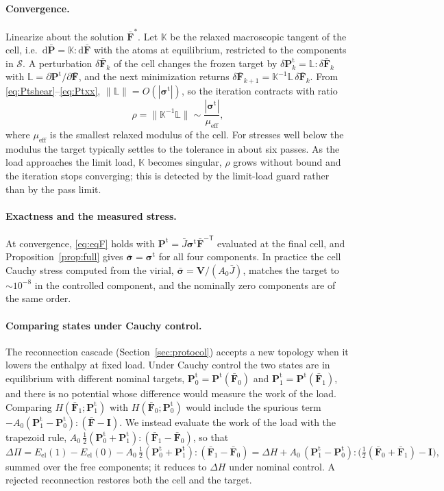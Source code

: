 \documentclass[11pt,a4paper]{article}
\newcommand{\Fb}{\bar{\mathbf F}}
\newcommand{\Pb}{\bar{\mathbf P}}
\newcommand{\sigb}{\bar{\bm\sigma}}
\newcommand{\Pt}{\mathbf P^{\mathrm t}}
\newcommand{\sigt}{\bm\sigma^{\mathrm t}}
\newcommand{\I}{\mathbf I}
\begin{document}
\paragraph{Convergence.}
Linearize about the solution \(\Fb^\ast\). Let \(\mathbb K\) be the relaxed macroscopic tangent of
the cell, i.e.\ \(\mathrm d\Pb=\mathbb K:\mathrm d\Fb\) with the atoms at equilibrium, restricted to
the components in \(\mathcal S\). A perturbation \(\delta\Fb_k\) of the cell changes the frozen target
by \(\delta\Pt_k=\mathbb L:\delta\Fb_k\) with \(\mathbb L=\partial\Pt/\partial\Fb\), and the next
minimization returns \(\delta\Fb_{k+1}=\mathbb K^{-1}\mathbb L\,\delta\Fb_k\). From
\eqref{eq:Ptshear}--\eqref{eq:Ptxx}, \(\|\mathbb L\|=O(|\sigt|)\), so the iteration contracts with
ratio
\begin{equation}
  \rho=\|\mathbb K^{-1}\mathbb L\|\sim\frac{|\sigt|}{\mu_{\mathrm{eff}}},
  \label{eq:rho}
\end{equation}
where \(\mu_{\mathrm{eff}}\) is the smallest relaxed modulus of the cell. For stresses well below
the modulus the target typically settles to the tolerance in about six passes. As the load
approaches the limit load, \(\mathbb K\) becomes singular, \(\rho\) grows without bound and the
iteration stops converging; this is detected by the limit-load guard rather than by the pass limit.

\paragraph{Exactness and the measured stress.}
At convergence, \eqref{eq:eqF} holds with \(\Pt=\bar J\sigt\Fb^{-\mathsf T}\) evaluated at the final
cell, and Proposition~\ref{prop:full} gives \(\sigb=\sigt\) for all four components. In practice
the cell Cauchy stress computed from the virial, \(\sigb=\mathbf V/(A_0\bar J)\), matches the target
to \(\sim10^{-8}\) in the controlled component, and the nominally zero components are of the same
order.

\paragraph{Comparing states under Cauchy control.}
The reconnection cascade (Section~\ref{sec:protocol}) accepts a new topology when it lowers the
enthalpy at fixed load. Under Cauchy control the two states are in equilibrium with different
nominal targets, \(\Pt_0=\Pt(\Fb_0)\) and \(\Pt_1=\Pt(\Fb_1)\), and there is no potential whose
difference would measure the work of the load. Comparing \(H(\Fb_1;\Pt_1)\) with \(H(\Fb_0;\Pt_0)\)
would include the spurious term \(-A_0(\Pt_1-\Pt_0):(\Fb-\I)\). We instead evaluate the work of the
load with the trapezoid rule, \(A_0\,\tfrac12(\Pt_0+\Pt_1):(\Fb_1-\Fb_0)\), so that
\begin{equation}
  \Delta\Pi=E_{\mathrm{el}}(1)-E_{\mathrm{el}}(0)-A_0\,\tfrac12(\Pt_0+\Pt_1):(\Fb_1-\Fb_0)
  =\Delta H+A_0\,(\Pt_1-\Pt_0):\big(\tfrac12(\Fb_0+\Fb_1)-\I\big),
  \label{eq:cauchyDPi}
\end{equation}
summed over the free components; it reduces to \(\Delta H\) under nominal control. A rejected
reconnection restores both the cell and the target.
\end{document}
